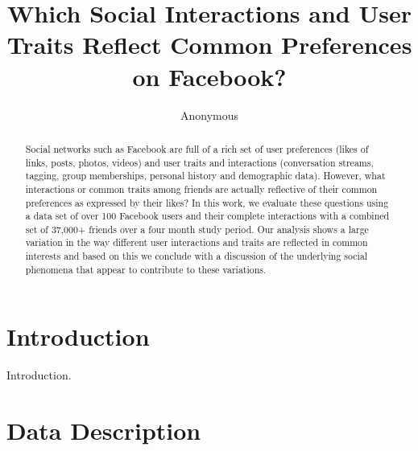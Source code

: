 \documentclass[letterpaper]{article}
\begin{document}
%
\title{Which Social Interactions and User Traits Reflect Common Preferences on Facebook?}
\author{Anonymous}
\maketitle
\begin{abstract}
Social networks such as Facebook are full of a rich set of user preferences (likes of links, posts, photos, videos) and user traits and interactions (conversation streams, tagging, group memberships, personal history and demographic data). However, what interactions or common traits among friends are actually reflective of their common preferences as expressed by their likes? In this work, we evaluate these questions using a data set of over 100 Facebook users and their complete interactions with a combined set of 37,000+ friends over a four month study period. Our analysis shows a large variation in the way different user interactions and traits are reflected in common interests and based on this we conclude with a discussion of the underlying social phenomena that appear to contribute to these variations.
\end{abstract}


\section{Introduction}


Introduction. \cite{influence}


\section{Data Description}
\end{document}
